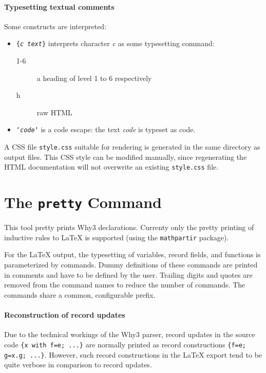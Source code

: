\paragraph{Typesetting textual comments}

Some constructs are interpreted:
\begin{itemize}
\item \texttt{\{\textsl{c text}\}} interprets character \textsl{c} as
  some typesetting command:
  \begin{description}
  \item[1-6] a heading of level 1 to 6 respectively
  \item[h] raw HTML
  \end{description}
\item \texttt{`\textsl{code}`} is a code escape: the text
  \textsl{code} is typeset as \why code.
\end{itemize}

A CSS file \verb|style.css| suitable for rendering is generated in the
same directory as output files. This CSS style can be modified manually,
since regenerating the HTML documentation will not overwrite an existing
\verb|style.css| file.

\section{The \texttt{pretty} Command}

This tool pretty prints Why3 declarations. Currenty only the pretty
printing of inductive rules to \LaTeX{} is supported (using the
\texttt{mathpartir} package). 

For the \LaTeX{} output, the typesetting of variables, record fields,
and functions is parameterized by commands. Dummy definitions of these
commands are printed in comments and have to be defined by the user.
Trailing digits and quotes are removed from the command names to reduce
the number of commands. The commands share a common, configurable prefix.

\paragraph{Reconstruction of record updates}
Due to the technical workings of the Why3 parser, record updates in the
source code \texttt{\{x with f=e; ...\}} are normally printed as record
constructions \texttt{\{f=e; g=x.g; ...\}}. However, such record
constructions in the \LaTeX{} export tend to be quite verbose in comparison
to record updates.

